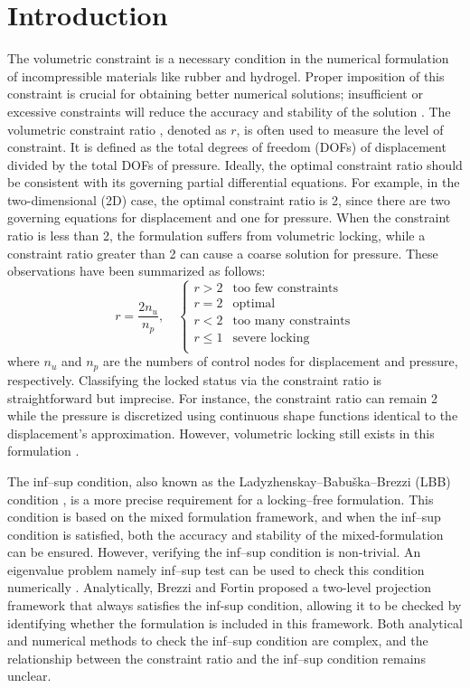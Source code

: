\section{Introduction}

The volumetric constraint is a necessary condition in the numerical formulation of incompressible materials like rubber and hydrogel.
Proper imposition of this constraint is crucial for obtaining better numerical solutions; insufficient or excessive constraints will reduce the accuracy and stability of the solution \cite{brezzi1991}.
The volumetric constraint ratio \cite{hughes2000}, denoted as $r$, is often used to measure the level of constraint.
It is defined as the total degrees of freedom (DOFs) of displacement divided by the total DOFs of pressure.
Ideally, the optimal constraint ratio should be consistent with its governing partial differential equations.
For example, in the two-dimensional (2D) case, the optimal constraint ratio is 2, since there are two governing equations for displacement and one for pressure.
When the constraint ratio is less than 2, the formulation suffers from volumetric locking, while a constraint ratio greater than 2 can cause a coarse solution for pressure.
These observations have been summarized as follows\cite{hughes2000}:
\begin{equation}
r = \frac{2n_u}{n_p}, \quad
\begin{cases}
r > 2 & \text{too few constraints} \\
r = 2 & \text{optimal} \\
r < 2 & \text{too many constraints} \\
r \le 1 & \text{severe locking} \\
\end{cases}
\end{equation}
where $n_u$ and $n_p$ are the numbers of control nodes for displacement and pressure, respectively.
Classifying the locked status via the constraint ratio is straightforward but imprecise.
For instance, the constraint ratio can remain 2 while the pressure is discretized using continuous shape functions identical to the displacement's approximation.
However, volumetric locking still exists in this formulation \cite{hughes2000}.

The inf--sup condition, also known as the Ladyzhenskay--Babuška--Brezzi (LBB) condition \cite{babuska1997,bathe1996}, is a more precise requirement for a locking--free formulation.
This condition is based on the mixed formulation framework, and when the inf--sup condition is satisfied, both the accuracy and stability of the mixed-formulation can be ensured.
However, verifying the inf--sup condition is non-trivial.
An eigenvalue problem namely inf--sup test can be used to check this condition numerically \cite{malkus1981,chapelle1993,brezzi,gallistl2019}.
Analytically, Brezzi and Fortin proposed a two-level projection framework that always satisfies the inf-sup condition,
allowing it to be checked by identifying whether the formulation is included in this framework.
Both analytical and numerical methods to check the inf--sup condition are complex,
and the relationship between the constraint ratio and the inf--sup condition remains unclear.

